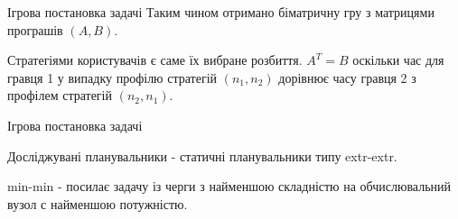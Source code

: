 \begin{frame}{Ігрова постановка задачі}
\manimate
	Таким чином отримано біматричну гру з матрицями програшів $(A,B)$.
	
	Стратегіями користувачів є саме їх вибране розбиття. $A^T = B$ оскільки час для гравця 1 у випадку профілю стратегій $(n_1, n_2)$ дорівнює часу гравця 2 з профілем стратегій $(n_2, n_1)$.
	
\end{frame}

\begin{frame}{Ігрова постановка задачі}
\manimate

	Досліджувані планувальники - статичні планувальники типу extr-extr.
	
	min-min - посилає задачу із черги з найменшою складністю на обчислювальний вузол с найменшою потужністю.

\end{frame}